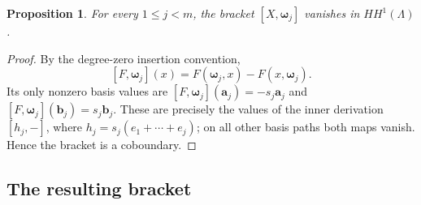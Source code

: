 \documentclass[a4paper,11pt,oneside,reqno]{amsart}
\newtheorem{proposition}[theorem]{Proposition}
\theoremstyle{definition}
\numberwithin{equation}{section}
\begin{document}
\begin{proposition}\label{gerst:even-center-bracket}
For every $1\le j<m$, the bracket $[X,\boldsymbol\omega_j]$ vanishes
in $HH^1(\Lambda)$.
\end{proposition}

\begin{proof}
By the degree-zero insertion convention,
\[
 [F,\boldsymbol\omega_j](x)
 =F(\boldsymbol\omega_j,x)-F(x,\boldsymbol\omega_j).
\]
Its only nonzero basis values are
$[F,\boldsymbol\omega_j](\mathbf a_j)=-s_j\mathbf a_j$ and
$[F,\boldsymbol\omega_j](\mathbf b_j)=s_j\mathbf b_j$.
These are precisely the values of the inner derivation
$[h_j,-]$, where $h_j=s_j(e_1+\cdots+e_j)$; on all other
basis paths both maps vanish.  Hence the bracket is a coboundary.
\end{proof}

\subsection{The resulting bracket}
\end{document}
